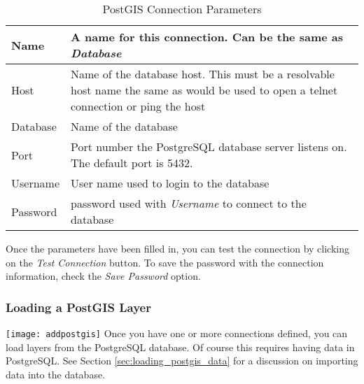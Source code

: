 \begin{table}[h]
\centering
\caption{PostGIS Connection
Parameters}\label{tab:postgis_connection_parms}\medskip
 \begin{tabular}{|l|p{5in}|}
\hline Name & A name for this connection. Can be the same as \textsl{Database}
\\
\hline Host \index{PostgreSQL!host}
& Name of the database host. This must be a resolvable host name the same as
would be used to open a telnet connection or ping the host \\
\hline Database \index{PostgreSQL!database} & Name of the database  \\
\hline Port \index{PostgreSQL!port}& Port number the PostgreSQL database
server listens on. The default port is 5432.\\
\hline Username \index{PostgreSQL!username}& User name used to login to the
database \\
\hline Password \index{PostgreSQL!password}& password used with
\textsl{Username} to connect to the database\\
\hline
\end{tabular}
\end{table}

Once the parameters have been filled in, you can test the connection by
clicking on the \textsl{Test
Connection} button. To save the password
with the connection information, check the \textsl{Save Password} option.

\begin{Tip}\caption{\textsc{QGIS User Settings and
Security}}
\end{Tip}

\subsubsection{Loading a PostGIS Layer}

\texttt{[image: addpostgis]} Once you have one or more
connections defined, you can load layers from the PostgreSQL database. Of
course this requires having data in PostgreSQL. See Section
\ref{sec:loading_postgis_data} for a discussion on importing data into the
database. 


